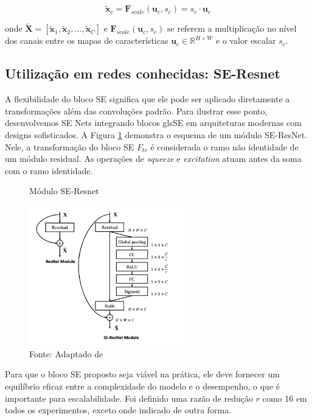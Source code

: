 \begin{equation}
\tilde{\mathbf{x}}_c = \mathbf{F}_{scale}(\mathbf{u}_c, s_c) = s_c \cdot \mathbf{u}_c 
\label{eq:se_scale}
\end{equation}

\noindent onde $\tilde{\mathbf{X}} = [\tilde{\mathbf{x}}_1, \tilde{\mathbf{x}}_2, \dots, \tilde{\mathbf{x}}_C]$ e $\mathbf{F}_{scale}(\mathbf{u}_c, s_c)$ se referem a multiplicação no nível dos canais entre os mapas de características $\mathbf{u}_c \in \mathbb{R}^{H \times W}$ e o valor escalar $s_c$.

\subsection{Utilização em redes conhecidas: SE-Resnet}
\label{subsec:util_resnet}

A flexibilidade do bloco \gls{SE} significa que ele pode ser aplicado diretamente a transformações além das convoluções padrão. Para ilustrar esse ponto, desenvolvemos \gls{SE} Nets integrando blocos gls{SE} em arquiteturas modernas com designs sofisticados. A Figura \ref{fig:fig026} demonstra o esquema de um módulo SE-ResNet. Nele, a transformação do bloco SE $F_{tr}$ é considerada o ramo não identidade de um módulo residual. As operações de \textit{squeeze} e \textit{excitation} atuam antes da soma com o ramo identidade.


\begin{figure}[h!]
    \centering
    \caption{Módulo SE-Resnet}
    \includegraphics[width=0.6\textwidth]{figures/fig026.png}
    \caption*{Fonte: Adaptado de \cite{huSqueezeandExcitationNetworks2018}}
    \label{fig:fig026}
\end{figure}

Para que o bloco SE proposto seja viável na prática, ele deve fornecer um equilíbrio eficaz entre a complexidade do modelo e o desempenho, o que é importante para escalabilidade. Foi definido uma razão de redução $r$ como 16 em todos os experimentos, exceto onde indicado de outra forma. 

